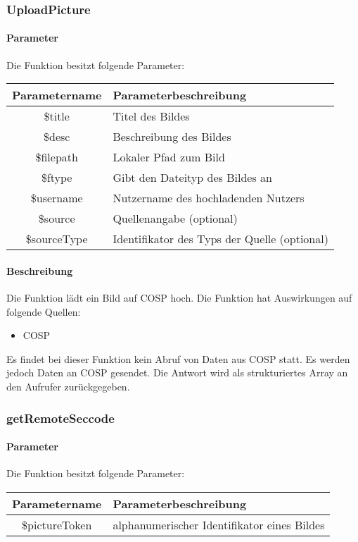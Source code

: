 \subsubsection{UploadPicture}
\paragraph{Parameter} Die Funktion besitzt folgende Parameter:
\begin{table}[H]
	\begin{tabular}{|c|p{11cm}|}
		\hline
		\textbf{Parametername} & \textbf{Parameterbeschreibung} \\ \hline
		\$title      & Titel des Bildes \\ \hline
		\$desc       & Beschreibung des Bildes \\ \hline
		\$filepath   & Lokaler Pfad zum Bild \\ \hline
		\$ftype      & Gibt den Dateityp des Bildes an \\ \hline
		\$username   & Nutzername des hochladenden Nutzers \\ \hline
		\$source     & Quellenangabe (optional) \\ \hline
		\$sourceType & Identifikator des Typs der Quelle (optional) \\ \hline
	\end{tabular}
\end{table}
\paragraph{Beschreibung} Die Funktion lädt ein Bild auf {\glqq COSP\grqq} hoch. Die Funktion hat Auswirkungen auf folgende Quellen:
\begin{itemize}
	\item COSP
\end{itemize}
Es findet bei dieser Funktion kein Abruf von Daten aus {\glqq COSP\grqq} statt. Es werden jedoch Daten an {\glqq COSP\grqq} gesendet. Die Antwort wird als strukturiertes Array an den Aufrufer zurückgegeben.
\subsubsection{getRemoteSeccode}
\paragraph{Parameter} Die Funktion besitzt folgende Parameter:
\begin{table}[H]
	\begin{tabular}{|c|p{11cm}|}
		\hline
		\textbf{Parametername} & \textbf{Parameterbeschreibung} \\ \hline
		\$pictureToken & alphanumerischer Identifikator eines Bildes \\ \hline
	\end{tabular}
\end{table}
